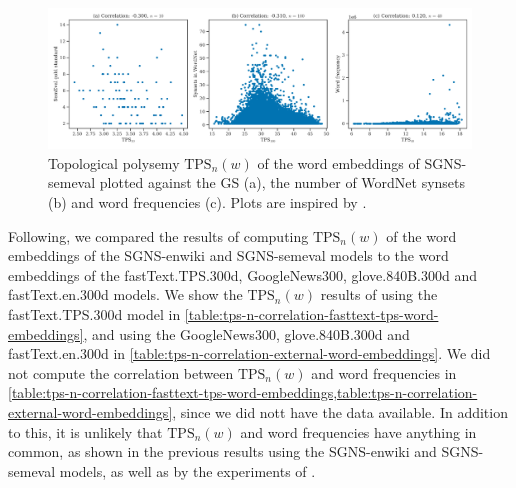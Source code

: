 \begin{figure}[H]
    \centering
    \includegraphics[width=\textwidth]{thesis/figures/tps-n-correlation-sgns-semeval_2010_task_14.pdf}
    \caption{Topological polysemy $\text{TPS}_n(w)$ of the word embeddings of SGNS-semeval plotted against the GS (a), the number of WordNet synsets (b) and word frequencies (c). Plots are inspired by \cite[Figures 8 and 9]{jakubowski2020topology}.}
    \label{fig:tps-n-correlation-sgns-semeval}
\end{figure}

Following, we compared the results of computing $\text{TPS}_n(w)$ of the word embeddings of the SGNS-enwiki and SGNS-semeval models to the word embeddings of the fastText.TPS.300d, GoogleNews300, glove.840B.300d and fastText.en.300d models. We show the $\text{TPS}_n(w)$ results of using the fastText.TPS.300d model in \cref{table:tps-n-correlation-fasttext-tps-word-embeddings}, and using the GoogleNews300, glove.840B.300d and fastText.en.300d in \cref{table:tps-n-correlation-external-word-embeddings}. We did not compute the correlation between $\text{TPS}_n(w)$ and word frequencies in \cref{table:tps-n-correlation-fasttext-tps-word-embeddings,table:tps-n-correlation-external-word-embeddings}, since we did nott have the data available. In addition to this, it is unlikely that $\text{TPS}_n(w)$ and word frequencies have anything in common, as shown in the previous results using the SGNS-enwiki and SGNS-semeval models, as well as by the experiments of \cite{jakubowski2020topology}.

